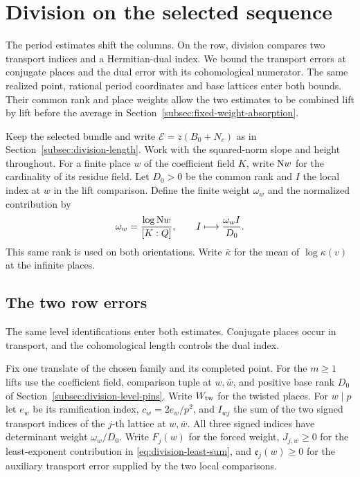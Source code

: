 \section{Division on the selected sequence}\label{sec:word-division}
\hypertarget{source-word-division}{}

The period estimates shift the columns. On the row, division compares two transport indices and a Hermitian-dual index.
We bound the transport errors at conjugate places and the dual
error with its cohomological numerator. The same realized
point, rational period coordinates and base lattices enter
both bounds. Their common rank and place weights allow the
two estimates to be combined lift by lift before the average
in Section~\ref{subsec:fixed-weight-absorption}.

Keep the selected bundle and write \(\mathcal E=z(B_0+N_c)\)
as in Section~\ref{subsec:division-length}. Work with the
squared-norm slope and height throughout. For a finite place \(w\) of the coefficient field \(K\),
write \({\rm N}w\) for the cardinality of its residue field.
Let \(D_0>0\) be the common rank and \(I\) the local index at \(w\) in the lift comparison. Define the finite weight \(\omega_w\) and the normalized contribution by
\begin{equation}\label{eq:division-local-index-weight}
 \omega_w=\frac{\log{\rm N}w}{[K:\mathbb Q]},\qquad
 I\longmapsto\frac{\omega_w I}{D_0}.
\end{equation}
This same rank is used on both orientations. Write \(\bar\kappa\)
for the mean of \(\log\kappa(v)\) at the infinite places.




\subsection{The two row errors}
\label{subsec:parent-row-errors}

The same level identifications enter both estimates. Conjugate places occur in transport, and the cohomological length controls the dual index.

Fix one translate of the chosen family and its completed point.
For the \(m\ge1\) lifts use the coefficient field, comparison tuple
at \(w,\bar w\), and positive base rank \(D_0\) of
Section~\ref{subsec:division-level-pins}. Write \(W_{\rm tw}\) for the
twisted places. For \(w\mid p\) let \(e_w\) be its ramification index,
\(c_w=2e_w/p^2\), and \(I_{wj}\) the sum of the two signed transport
indices of the \(j\)-th lattice at \(w,\bar w\). All three signed indices have determinant weight \(\omega_w/D_0\). Write \(F_j(w)\) for the
forced weight, \(J_{j,w}\ge0\) for the least-exponent contribution in
\eqref{eq:division-least-sum}, and \(\mathfrak e_j(w)\ge0\) for the
auxiliary transport error supplied by the two local comparisons.

